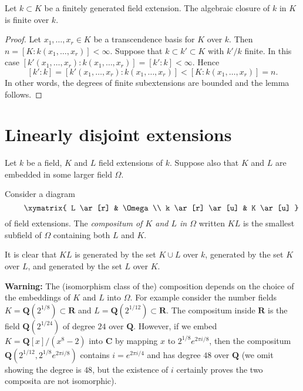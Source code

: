 \begin{lemma}
\label{lemma-algebraic-closure-in-finitely-generated}
Let $k \subset K$ be a finitely generated field extension.
The algebraic closure of $k$ in $K$ is finite over $k$.
\end{lemma}

\begin{proof}
Let $x_1, \ldots, x_r \in K$ be a transcendence basis for $K$
over $k$. Then $n = [K : k(x_1, \ldots, x_r)] < \infty$.
Suppose that $k \subset k' \subset K$ with $k'/k$ finite.
In this case
$[k'(x_1, \ldots, x_r) : k(x_1, \ldots, x_r)] = [k' : k] < \infty$.
Hence
$$
[k' : k] = [k'(x_1, \ldots, x_r) : k(x_1, \ldots, x_r)]
< [K : k(x_1, \ldots, x_r)] = n.
$$
In other words, the degrees of finite subextensions are bounded
and the lemma follows.
\end{proof}






\section{Linearly disjoint extensions}
\label{section-linearly-disjoint}

\noindent
Let $k$ be a field, $K$ and $L$ field extensions of $k$.
Suppose also that $K$ and $L$ are embedded in some larger field $\Omega$.

\begin{definition}
\label{definition-compositum}
Consider a diagram
\begin{equation}
\label{equation-inside-omega}
\vcenter{
\xymatrix{
L \ar[r] & \Omega \\
k \ar[r] \ar[u] & K \ar[u]
}
}
\end{equation}
of field extensions. The {\it compositum of $K$ and $L$ in $\Omega$}
written $KL$ is the smallest subfield of $\Omega$ containing both
$L$ and $K$.
\end{definition}

\noindent
It is clear that $KL$ is generated by the set $K \cup L$ over $k$,
generated by the set $K$ over $L$, and generated by the set $L$ over $K$.

\medskip\noindent
{\bf Warning:} The (isomorphism class of the) composition depends on
the choice of the embeddings of $K$ and $L$ into $\Omega$. For example
consider the number fields $K = \mathbf{Q}(2^{1/8}) \subset \mathbf{R}$ and
$L = \mathbf{Q}(2^{1/12}) \subset \mathbf{R}$. The compositum inside
$\mathbf{R}$ is the field $\mathbf{Q}(2^{1/24})$ of degree $24$ over
$\mathbf{Q}$. However, if we embed $K = \mathbf{Q}[x]/(x^8 - 2)$ into
$\mathbf{C}$ by mapping $x$ to $2^{1/8}e^{2\pi i/8}$, then the compositum
$\mathbf{Q}(2^{1/12}, 2^{1/8}e^{2\pi i/8})$ contains $i = e^{2\pi i/4}$ and has
degree $48$ over $\mathbf{Q}$ (we omit showing the degree is $48$, but
the existence of $i$ certainly proves the two composita are not isomorphic).

